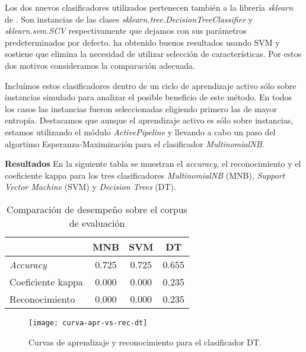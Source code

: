 Los dos nuevos clasificadores utilizados pertenecen también a la librería \textit{sklearn} de \citet{scikit-learn}. Son instancias de las clases \textit{sklearn.tree.DecisionTreeClassifier} y \textit{sklearn.svm.SCV} respectivamente que dejamos con sus parámetros predeterminados por defecto. \citet{svm-uso-Joachims} ha obtenido buenos resultados usando SVM y sostiene que elimina la necesidad de utilizar selección de características. Por estos dos motivos consideramos la comparación adecuada.

Incluímos estos clasificadores dentro de un ciclo de aprendizaje activo sólo sobre instancias simulado para analizar el posible beneficio de este método. En todos los casos las instancias fueron seleccionadas eligiendo primero las de mayor entropía. Destacamos que aunque el aprendizaje activo es sólo sobre instancias, estamos utilizando el módulo \textit{ActivePipeline} y llevando a cabo un paso del algortimo Esperanza-Maximización para el clasificador \textit{MultinomialNB}.

\vspace{3 mm}

\textbf{Resultados} En la siguiente tabla se muestran el \textit{accuracy}, el reconocimiento y el coeficiente kappa para los tres clasificadores \textit{MultinomialNB} (MNB), \textit{Support Vector Machine} (SVM) y \textit{Decision Trees} (DT).

\begin{table}[h]
\centering
\begin{tabular}{l c c c}
     & MNB & SVM & DT\\ [0.5ex]
    \hline
    \textit{Accuracy} & 0.725 & 0.725 & 0.655 \\ [0.5ex]
    Coeficiente kappa & 0.000 & 0.000 & 0.235 \\ [0.5ex]
    Reconocimiento & 0.000 & 0.000 & 0.235 \\[1ex]
    \hline
\end{tabular}
\caption{Comparación de desempeño sobre el corpus de evaluación}
\end{table}

\begin{figure}[h!]\label{curva-apr-vs-rec-dt}
\texttt{[image: curva-apr-vs-rec-dt]}
\caption{Curvas de aprendizaje y reconocimiento para el clasificador DT.}
\centering
\end{figure}

